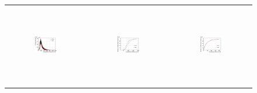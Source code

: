 \begin{figure}[htp]
  \centering
  \label{fig:containment}
  
  \begin{tabular}{ccc}
%  
   \includegraphics[width=0.31\textwidth,height=3.5cm]{figures/protons_density_overlay}&
   \includegraphics[width=0.31\textwidth,height=3.5cm]{figures/protons_lcont_overlay}&
   \includegraphics[width=0.31\textwidth,height=3.5cm]{figures/protons_wcont_overlay}\\
% 
 

\end{tabular}
\end{figure}
